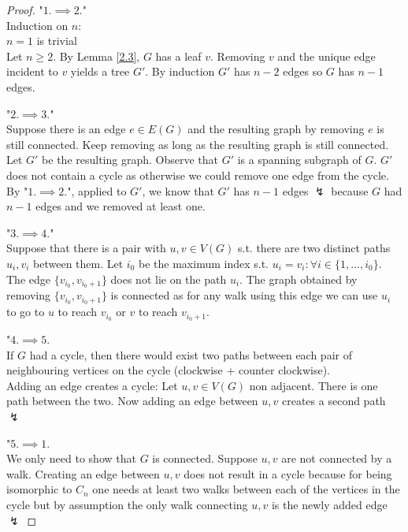 \begin{proof}
    "$1.\implies 2.$"\hfill \\
    Induction on $n$:\\
    $n=1$ is trivial\\
    Let $n\geq2$. By Lemma \ref{2.3}, $G$ has a leaf $v$. Removing $v$ and the unique edge incident to $v$ yields a tree $G'$. By induction $G'$ has $n-2$ edges so $G$ has $n-1$ edges.\par
    \vspace{0.3cm}
    "$2.\implies3.$"\\
    Suppose there is an edge $e\in E(G)$ and the resulting graph by removing $e$ is still connected. Keep removing as long as the resulting graph is still connected. Let $G'$ be the resulting graph. Observe that $G'$ is a spanning subgraph of $G$. $G'$ does not contain a cycle as otherwise we could remove one edge from the cycle. By "$1.\implies 2.$", applied to $G'$, we know that $G'$ has $n-1$ edges $\lightning$ because $G$ had $n-1$ edges and we removed at least one.\par
    \vspace{0.3cm}
    "$3.\implies 4.$"\\
    Suppose that there is a pair with $u,v\in V(G)$ s.t. there are two distinct paths $u_i,v_i$ between them. Let $i_0$ be the maximum index s.t. $u_i=v_i:\forall i\in\{1,...,i_0\}$. The edge $\{v_{i_0},v_{i_0+1}\}$ does not lie on the path $u_i$. The graph obtained by removing $\{v_{i_0},v_{i_0+1}\}$ is connected as for any walk using this edge we can use $u_i$ to go to $u$ to reach $v_{i_0}$ or $v$ to reach $v_{i_0+1}$.\par
    \vspace{0.3cm}
    "$4.\implies5.$\\
    If $G$ had a cycle, then there would exist two paths between each pair of neighbouring vertices on the cycle (clockwise + counter clockwise).\\
    Adding an edge creates a cycle: Let $u,v\in V(G)$ non adjacent. There is one path between the two. Now adding an edge between $u,v$ creates a second path $\lightning$\par
    \vspace{0.3cm}
    "$5.\implies 1.$\\
    We only need to show that $G$ is connected. Suppose $u,v$ are not connected by a walk. Creating an edge between $u,v$ does not result in a cycle because for being isomorphic to $C_n$ one needs at least two walks between each of the vertices in the cycle but by assumption the only walk connecting $u,v$ is the newly added edge $\lightning$
\end{proof}
